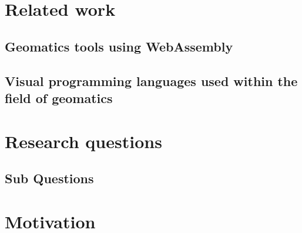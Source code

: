 \section{Related work}





\subsection{Geomatics tools using WebAssembly}

% 
\subsection{Visual programming languages used within the field of geomatics}

\section{Research questions}

\subsection{Sub Questions}



\section{Motivation}



